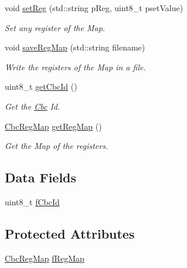 \begin{DoxyCompactItemize}
void \hyperlink{class_ph2___hw_description_1_1_cbc_aa24292fe56d6b19ec08ba67f9790b5c7}{set\-Reg} (std\-::string p\-Reg, uint8\-\_\-t pset\-Value)
\begin{DoxyCompactList}\small\item\em Set any register of the Map. \end{DoxyCompactList}\item 
void \hyperlink{class_ph2___hw_description_1_1_cbc_a89ca4609c24b4186a8e2080abb4b016b}{save\-Reg\-Map} (std\-::string filename)
\begin{DoxyCompactList}\small\item\em Write the registers of the Map in a file. \end{DoxyCompactList}\item 
uint8\-\_\-t \hyperlink{class_ph2___hw_description_1_1_cbc_a14a78f27fb0e6c74622b6bc49259a2f3}{get\-Cbc\-Id} ()
\begin{DoxyCompactList}\small\item\em Get the \hyperlink{class_ph2___hw_description_1_1_cbc}{Cbc} Id. \end{DoxyCompactList}\item 
\hyperlink{namespace_ph2___hw_description_a9a23b373068f169aa67ca1d22c9a6001}{Cbc\-Reg\-Map} \hyperlink{class_ph2___hw_description_1_1_cbc_ad2bae647b2474b4737d7f2ede5a73ed3}{get\-Reg\-Map} ()
\begin{DoxyCompactList}\small\item\em Get the Map of the registers. \end{DoxyCompactList}\end{DoxyCompactItemize}
\subsection*{Data Fields}
\begin{DoxyCompactItemize}
\item 
uint8\-\_\-t \hyperlink{class_ph2___hw_description_1_1_cbc_a99b392306d4cdb7ffa7f956fc553011c}{f\-Cbc\-Id}
\end{DoxyCompactItemize}
\subsection*{Protected Attributes}
\begin{DoxyCompactItemize}
\item 
\hyperlink{namespace_ph2___hw_description_a9a23b373068f169aa67ca1d22c9a6001}{Cbc\-Reg\-Map} \hyperlink{class_ph2___hw_description_1_1_cbc_ab4dbf1af172e821d95f77acb7e4fb962}{f\-Reg\-Map}
\end{DoxyCompactItemize}


